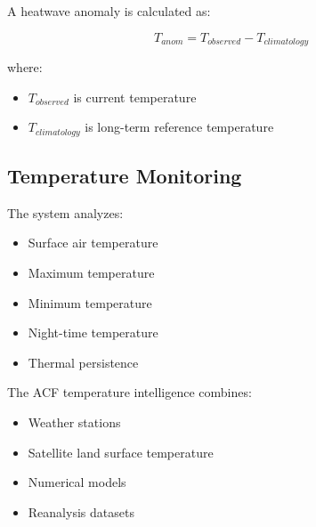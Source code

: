A heatwave anomaly is calculated as:

\[
T_{anom}
=
T_{observed}
-
T_{climatology}
\]


where:

\begin{itemize}

\item $T_{observed}$ is current temperature

\item $T_{climatology}$ is long-term reference temperature

\end{itemize}



\subsection{Temperature Monitoring}

The system analyzes:

\begin{itemize}

\item Surface air temperature

\item Maximum temperature

\item Minimum temperature

\item Night-time temperature

\item Thermal persistence

\end{itemize}


The ACF temperature intelligence combines:

\begin{itemize}

\item Weather stations

\item Satellite land surface temperature

\item Numerical models

\item Reanalysis datasets

\end{itemize}



